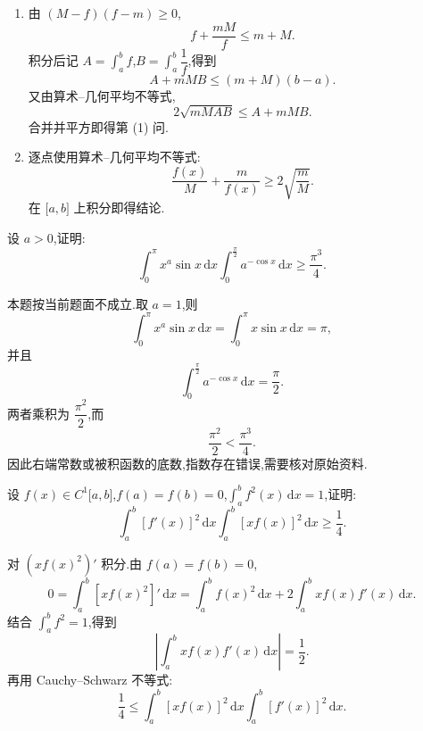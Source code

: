 \begin{solution}
    \leavevmode
    \begin{enumerate}
        \item 由 $(M-f)(f-m)\geq0$,
              \[
                  f+\dfrac{mM}{f}\leq m+M.
              \]
              积分后记 $A=\displaystyle\int_a^bf$,$B=\displaystyle\int_a^b\dfrac{1}{f}$,得到
              \[
                  A+mMB\leq(m+M)(b-a).
              \]
              又由算术--几何平均不等式,
              \[
                  2\sqrt{mMAB}\leq A+mMB.
              \]
              合并并平方即得第 (1) 问.

        \item 逐点使用算术--几何平均不等式:
              \[
                  \dfrac{f(x)}{M}+\dfrac{m}{f(x)}
                  \geq2\sqrt{\dfrac{m}{M}}.
              \]
              在 $\lbrack a,b\rbrack$ 上积分即得结论.
    \end{enumerate}
\end{solution}

\begin{example}
    设 $a>0$,证明:
    \[
        \displaystyle\int_0^\pi x^a\sin x\,\mathrm{d}x
        \int_0^{\frac{\pi}{2}}a^{-\cos x}\,\mathrm{d}x
        \geq\dfrac{\pi^3}{4}.
    \]
\end{example}
\exampleblank

\begin{solution}
    本题按当前题面不成立.取 $a=1$,则
    \[
        \displaystyle\int_0^\pi x^a\sin x\,\mathrm{d}x
        =\int_0^\pi x\sin x\,\mathrm{d}x=\pi,
    \]
    并且
    \[
        \displaystyle\int_0^{\frac{\pi}{2}}a^{-\cos x}\,\mathrm{d}x
        =\dfrac{\pi}{2}.
    \]
    两者乘积为 $\dfrac{\pi^2}{2}$,而
    \[
        \dfrac{\pi^2}{2}<\dfrac{\pi^3}{4}.
    \]
    因此右端常数或被积函数的底数,指数存在错误,需要核对原始资料.
\end{solution}

\begin{example}
    设 $f(x)\in C^1\lbrack a,b\rbrack$,$f(a)=f(b)=0$,$\displaystyle\int_a^bf^2(x)\,\mathrm{d}x=1$,证明:
    \[
        \displaystyle\int_a^b[f'(x)]^2\,\mathrm{d}x
        \int_a^b[xf(x)]^2\,\mathrm{d}x
        \geq\dfrac{1}{4}.
    \]
\end{example}
\exampleblank

\begin{solution}
    对 $(xf(x)^2)'$ 积分.由 $f(a)=f(b)=0$,
    \[
        0=\int_a^b[xf(x)^2]'\,\mathrm{d}x
        =\int_a^bf(x)^2\,\mathrm{d}x
        +2\int_a^bxf(x)f'(x)\,\mathrm{d}x.
    \]
    结合 $\displaystyle\int_a^bf^2=1$,得到
    \[
        \left|\int_a^bxf(x)f'(x)\,\mathrm{d}x\right|
        =\dfrac{1}{2}.
    \]
    再用 Cauchy--Schwarz 不等式:
    \[
        \dfrac{1}{4}
        \leq\int_a^b[xf(x)]^2\,\mathrm{d}x
        \int_a^b[f'(x)]^2\,\mathrm{d}x.
    \]
\end{solution}

